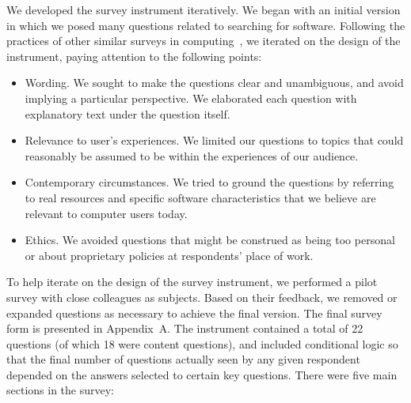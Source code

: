 \documentclass{casicswhitepaper}
\begin{document}
We developed the survey instrument iteratively.  We began with an initial version in which we posed many questions related to searching for software.  Following the practices of other similar surveys in computing~\cite[e.g.,][]{varnellsarjeant2015comparing}, we iterated on the design of the instrument, paying attention to the following points:

\begin{itemize}

\item Wording.  We sought to make the questions clear and unambiguous, and avoid implying a particular perspective.  We elaborated each question with explanatory text under the question itself.

\item Relevance to user's experiences.  We limited our questions to topics that could reasonably be assumed to be within the experiences of our audience.

\item Contemporary circumstances.  We tried to ground the questions by referring to real resources and specific software characteristics that we believe are relevant to computer users today.

\item Ethics.  We avoided questions that might be construed as being too personal or about proprietary policies at respondents' place of work.

\end{itemize}

To help iterate on the design of the survey instrument, we performed a pilot survey with close colleagues as subjects.  Based on their feedback, we removed or expanded questions as necessary to achieve the final version.  The final survey form is presented in Appendix~A.  The instrument contained a total of 22 questions (of which 18 were content questions), and included conditional logic so that the final number of questions actually seen by any given respondent depended on the answers selected to certain key questions.  There were five main sections in the survey:
\end{document}
